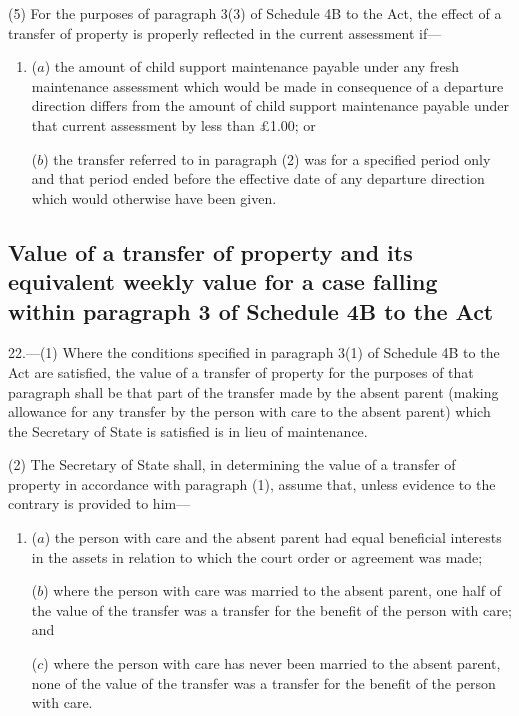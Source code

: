 \documentclass[a4paper]{article}
\begin{document}
(5) For the purposes of paragraph 3(3) of Schedule 4B to the Act, the effect of
a transfer of property is properly reflected in the current assessment if—
\begin{enumerate}\item[]
($a$) the amount of child support maintenance payable under any fresh maintenance
assessment which would be made in consequence of a departure direction differs
from the amount of child support maintenance payable under that current
assessment by less than £1.00; or

($b$) the transfer referred to in paragraph (2) was for a specified period only and
that period ended before the effective date of any departure direction which
would otherwise have been given.
\end{enumerate}

\subsection[22. Value of a transfer of property and its equivalent weekly value for a case
falling within paragraph 3 of Schedule 4B to the Act]{Value of a transfer of property and its equivalent weekly value for a case
falling within paragraph 3 of Schedule 4B to the Act}

22.—(1) Where the conditions
specified in paragraph 3(1) of Schedule 4B to the Act are satisfied, the value
of a transfer of property for the purposes of that paragraph shall be that part
of the transfer made by the absent parent (making allowance for any transfer by
the person with care to the absent parent) which the Secretary of State is
satisfied is in lieu of maintenance.

(2) The Secretary of State shall, in determining the value of a transfer of
property in accordance with paragraph (1), assume that, unless evidence to the
contrary is provided to him—
\begin{enumerate}\item[]
($a$) the person with care and the absent parent had equal beneficial interests in
the assets in relation to which the court order or agreement was made;

($b$) where the person with care was married to the absent parent, one half of the
value of the transfer was a transfer for the benefit of the person with care;
and

($c$) where the person with care has never been married to the absent parent, none
of the value of the transfer was a transfer for the benefit of the person with
care.
\end{enumerate}
\end{document}
